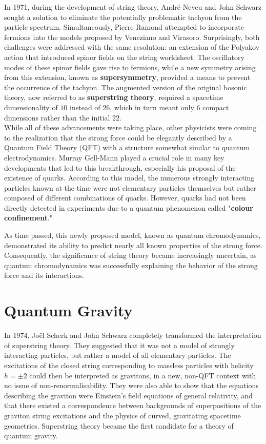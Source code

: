 \documentclass[12pt]{article}
\begin{document}
In 1971, during the development of string theory, André Neveu and John Schwarz sought a solution to eliminate the potentially problematic tachyon from the particle spectrum. Simultaneously, Pierre Ramond attempted to incorporate fermions into the models proposed by Veneziano and Virasoro. Surprisingly, both challenges were addressed with the same resolution: an extension of the Polyakov action that introduced spinor fields on the string worldsheet. The oscillatory modes of these spinor fields gave rise to fermions, while a new symmetry arising from this extension, known as \textbf{supersymmetry}, provided a means to prevent the occurrence of the tachyon. The augmented version of the original bosonic theory, now referred to as \textbf{superstring theory}, required a spacetime dimensionality of $10$ instead of $26$, which in turn meant only $6$ compact dimensions rather than the initial $22$.\\
While all of these advancements were taking place, other physicists were coming to the realization that the strong force could be elegantly described by a Quantum Field Theory (QFT) with a structure somewhat similar to quantum electrodynamics. Murray Gell-Mann played a crucial role in many key developments that led to this breakthrough, especially his proposal of the existence of quarks. According to this model, the numerous strongly interacting particles known at the time were not elementary particles themselves but rather composed of different combinations of quarks. However, quarks had not been directly detected in experiments due to a quantum phenomenon called "\textbf{colour confinement}."

As time passed, this newly proposed model, known as quantum chromodynamics, demonstrated its ability to predict nearly all known properties of the strong force. Consequently, the significance of string theory became increasingly uncertain, as quantum chromodynamics was successfully explaining the behavior of the strong force and its interactions.


\section{Quantum Gravity}

In 1974, Joël Scherk and John Schwarz completely transformed the interpretation of superstring theory. They suggested that it was not a model of strongly interacting particles, but rather a model of all elementary particles. The excitations of the closed string corresponding to massless particles with helicity $h = \pm 2$ could then be interpreted as gravitons, in a new, non-QFT context with no issue of non-renormalisability. They were also able to show that the equations describing the graviton were Einstein's field equations of general relativity, and that there existed a correspondence between backgrounds of superpositions of the graviton string excitations and the physics of curved, gravitating spacetime geometries. Superstring theory became the first candidate for a theory of quantum gravity.
\newline
\end{document}
